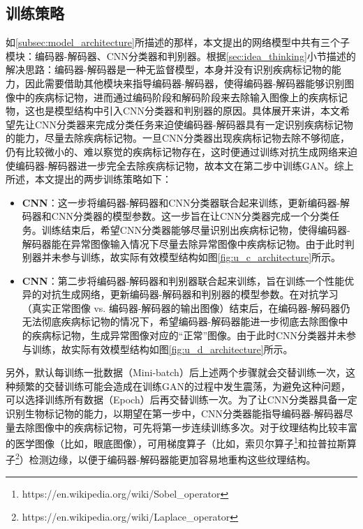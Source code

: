\subsection{训练策略}\label{subsec:traing_stragies}
如\ref{subsec:model_architecture}所描述的那样，本文提出的网络模型中共有三个子模块：编码器-解码器、CNN分类器和判别器。根据\ref{sec:idea_thinking}小节描述的解决思路：编码器-解码器是一种无监督模型，本身并没有识别疾病标记物的能力，因此需要借助其他模块来指导编码器-解码器，使得编码器-解码器能够识别图像中的疾病标记物，进而通过编码阶段和解码阶段来去除输入图像上的疾病标记物，这也是模型结构中引入CNN分类器和判别器的原因。具体展开来讲，本文希望先让CNN分类器来完成分类任务来迫使编码器-解码器具有一定识别疾病标记物的能力，尽量去除疾病标记物。一旦CNN分类器出现疾病标记物去除不够彻底，仍有比较微小的、难以察觉的疾病标记物存在，这时便通过训练对抗生成网络来迫使编码器-解码器进一步完全去除疾病标记物，故本文在第二步中训练GAN。综上所述，本文提出的两步训练策略如下：
\begin{itemize}\label{item:training_steps}
	\item 
	\textbf{CNN}：这一步将编码器-解码器和CNN分类器联合起来训练，更新编码器-解码器和CNN分类器的模型参数。这一步旨在让CNN分类器完成一个分类任务。训练结束后，希望CNN分类器能够尽量识别出疾病标记物，使得编码器-解码器能在异常图像输入情况下尽量去除异常图像中疾病标记物。由于此时判别器并未参与训练，故实际有效模型结构如图\ref{fig:u_c_architecture}所示。
	\item {}\textbf{CNN}：第二步将编码器-解码器和判别器联合起来训练，旨在训练一个性能优异的对抗生成网络，更新编码器-解码器和判别器的模型参数。在对抗学习（真实正常图像 vs. 编码器-解码器的输出图像）结束后，在编码器-解码器仍无法彻底疾病标记物的情况下，希望编码器-解码器能进一步彻底去除图像中的疾病标记物，生成异常图像对应的“正常”图像。由于此时CNN分类器并未参与训练，故实际有效模型结构如图\ref{fig:u_d_architecture}所示。
\end{itemize}
另外，默认每训练一批数据（Mini-batch）后上述两个步骤就会交替训练一次，这种频繁的交替训练可能会造成在训练GAN的过程中发生震荡，为避免这种问题，可以选择训练所有数据（Epoch）后再交替训练一次。为了让CNN分类器具备一定识别生物标记物的能力，以期望在第一步中，CNN分类器能指导编码器-解码器尽量去除图像中的疾病标记物，可先将第一步连续训练多次。对于纹理结构比较丰富的医学图像（比如，眼底图像），可用梯度算子（比如，索贝尔算子\footnote{https://en.wikipedia.org/wiki/Sobel\_operator}和拉普拉斯算子\footnote{https://en.wikipedia.org/wiki/Laplace\_operator}）检测边缘，以便于编码器-解码器能更加容易地重构这些纹理结构。

